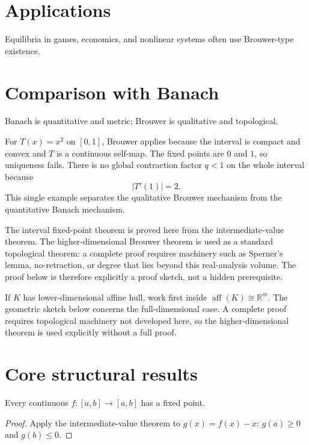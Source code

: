 \section{Applications}
Equilibria in games, economics, and nonlinear systems often use Brouwer-type existence.

\section{Comparison with Banach}
Banach is quantitative and metric; Brouwer is qualitative and topological.


\begin{example}\label{ex:ii17-expand-03}
For \(T(x)=x^2\) on \([0,1]\), Brouwer applies because the interval is compact
and convex and \(T\) is a continuous self-map. The fixed points are \(0\) and
\(1\), so uniqueness fails. There is no global contraction factor \(q<1\) on
the whole interval because
\[
|T'(1)|=2.
\]
This single example separates the qualitative Brouwer mechanism from the
quantitative Banach mechanism.
\end{example}
\begin{remark}
The interval fixed-point theorem is proved here from the intermediate-value theorem. The higher-dimensional Brouwer theorem is used as a standard topological theorem: a complete proof requires machinery such as Sperner's lemma, no-retraction, or degree that lies beyond this real-analysis volume. The proof below is therefore explicitly a proof sketch, not a hidden prerequisite.
\end{remark}

\begin{remark}
If $K$ has lower-dimensional affine hull, work first inside $\operatorname{aff}(K)\cong\mathbb R^m$. The geometric sketch below concerns the full-dimensional case. A complete proof requires topological machinery not developed here, so the higher-dimensional theorem is used explicitly without a full proof.
\end{remark}

\section{Core structural results}

\begin{theorem}\label{thm:ii17-01}
Every continuous $f:[a,b]\to[a,b]$ has a fixed point.
\begin{proof}
Apply the intermediate-value theorem to $g(x)=f(x)-x$: $g(a)\ge0$ and $g(b)\le0$.
\end{proof}
\end{theorem}

